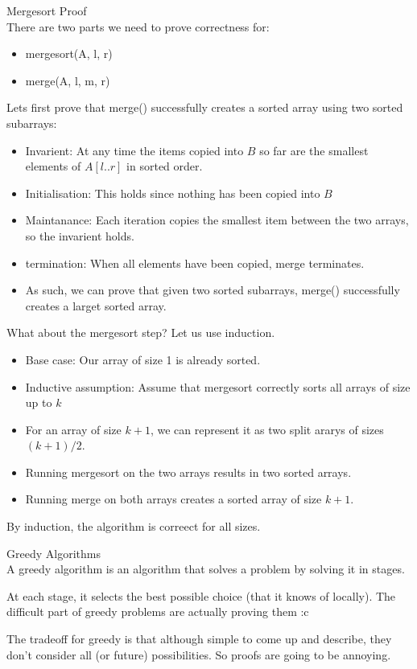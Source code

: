 \documentclass[journal, letterpaper]{IEEEtran}
\begin{document}
\begin{example}{Mergesort Proof}\\
    There are two parts we need to prove correctness for: 
    \begin{itemize}
        \item mergesort(A, l, r)
        \item merge(A, l, m, r)
    \end{itemize}

    Lets first prove that merge() successfully creates a sorted array using two sorted
    subarrays:
    \begin{itemize}
        \item Invarient: At any time the items copied into $B$ so far are the smallest elements of
            $A[l..r]$ in sorted order.
        \item Initialisation: This holds since nothing has been copied into $B$
        \item Maintanance: Each iteration copies the smallest item between the two arrays, so the
            invarient holds.
        \item termination: When all elements have been copied, merge terminates.
        \item As such, we can prove that given two sorted subarrays, merge() successfully
            creates a larget sorted array.
    \end{itemize}

    What about the mergesort step?
    Let us use induction.
    \begin{itemize}
        \item Base case: Our array of size 1 is already sorted. 
        \item Inductive assumption: Assume that mergesort correctly sorts all arrays of
            size up to $k$
        \item For an array of size $k + 1$, we can represent it as two split ararys of
            sizes $(k + 1)/2$. 
        \item Running mergesort on the two arrays results in two sorted arrays. 
        \item Running merge on both arrays creates a sorted array of size $k + 1$.
    \end{itemize}

    By induction, the algorithm is correect for all sizes.
\end{example}

\begin{theory}{Greedy Algorithms}\\
    A greedy algorithm is an algorithm that solves a problem by solving it in stages. 

    At each stage, it selects the best possible choice (that it knows of locally). The
    difficult part of greedy problems are actually proving them :c

    The tradeoff for greedy is that although simple to come up and describe, they don't
    consider all (or future) possibilities. So proofs are going to be annoying.
\end{theory}
\end{document}
